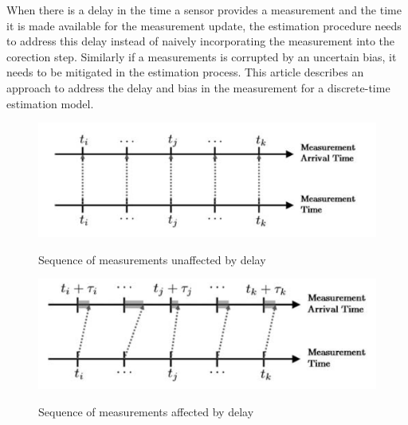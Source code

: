 When there is a delay in the time a sensor provides a measurement and the time it is made available for the measurement update, the estimation procedure needs to address this delay instead of naively incorporating the measurement into the corection step.
Similarly if a measurements is corrupted by an uncertain bias, it needs to be mitigated in the estimation process.
This article describes an approach to address the delay and bias in the measurement for a discrete-time estimation model.

\begin{figure}
	{\includegraphics[width=1.0\columnwidth]{./img/undelayed_measurement.png}}
	\caption{Sequence of measurements unaffected by delay}
	\label{fig:undelayed_measurement}
\end{figure} 

\begin{figure}
	{\includegraphics[width=1.0\columnwidth]{./img/delayed_measurement.png}}
	\caption{Sequence of measurements affected by delay}
	\label{fig:delayed_measurement}
\end{figure} 


 